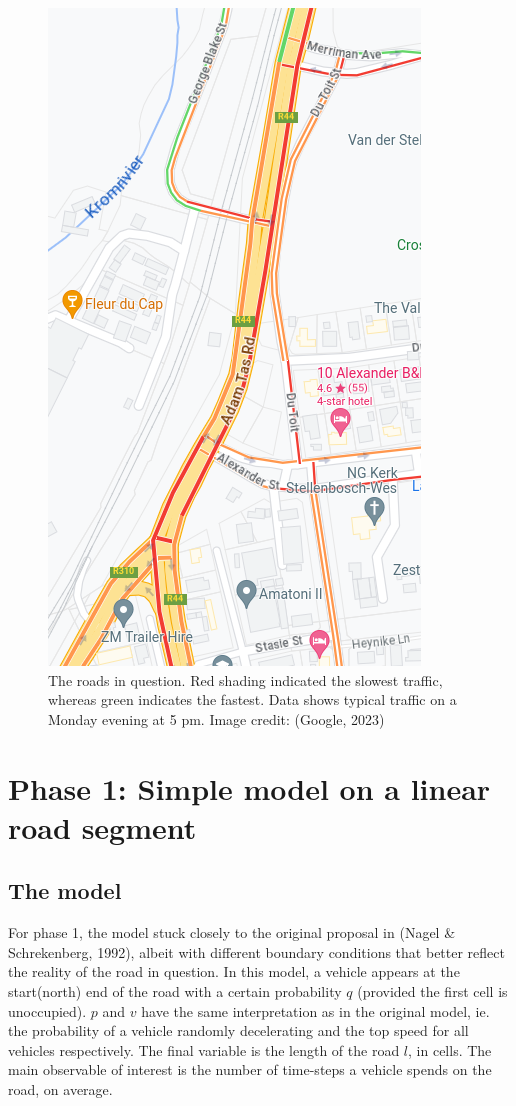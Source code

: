 \documentclass{article}
\begin{document}
\begin{figure}
\includegraphics[scale = 0.75]{images/road.png}
\caption{\label{fig} The roads in question. Red shading indicated the slowest traffic, whereas green indicates the fastest. Data shows typical traffic on a Monday evening at 5 pm. Image credit: (Google, 2023)}
\end{figure}

\section*{Phase 1: Simple model on a linear road segment}

\subsection*{The model}

For phase 1, the model stuck closely to the original proposal in (Nagel \& Schrekenberg, 1992), albeit with different boundary conditions that better reflect the reality of the road in question. In this model, a vehicle appears at the start(north) end of the road with a certain probability $q$ (provided the first cell is unoccupied). $p$ and $v$ have the same interpretation as in the original model, ie. the probability of a vehicle randomly decelerating and the top speed for all vehicles respectively. The final variable is the length of the road $l$, in cells. The main observable of interest is the number of time-steps a vehicle spends on the road, on average.
\end{document}
